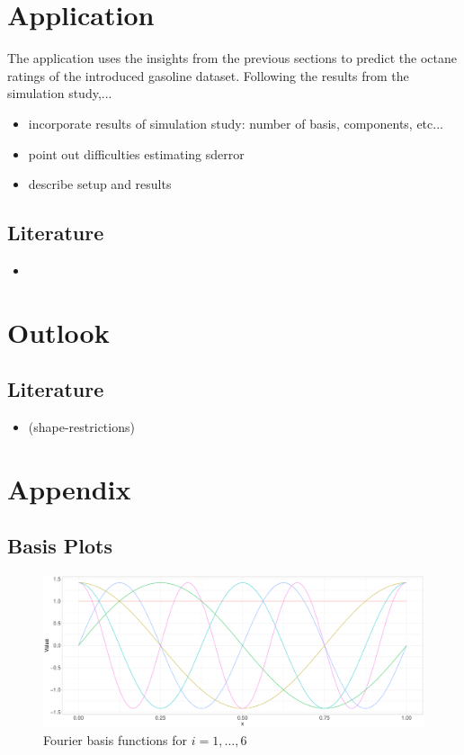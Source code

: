 \documentclass[11pt,twoside,a4paper]{article}
\begin{document}
	\newpage
	\section{Application}
		The application uses the insights from the previous sections to predict the octane ratings of the introduced gasoline dataset. Following the results from the simulation study,... 
		\begin{itemize}
			\item {\color{green} incorporate results of simulation study: number of basis, components, etc...}
			\item point out difficulties estimating sderror
			\item describe setup and results
\end{itemize}
	
	\subsection{Literature}
	\begin{itemize}
		\item \cite{carey_life_2002}
	\end{itemize}

	\section{Outlook}
	
	\subsection{Literature}
	\begin{itemize}
		\item \cite{James.2009} (shape-restrictions)
	\end{itemize}
	
	\newpage
	\section{Appendix}
	
	\subsection{Basis Plots}
	
	\begin{figure}[H]\label{fourier_basis}
		\includegraphics[width = \textwidth]{../Graphics/Fourier_Basis.pdf}
		\caption{Fourier basis functions for $i = 1,\dots,6$}
	\end{figure}
	
\end{document}
